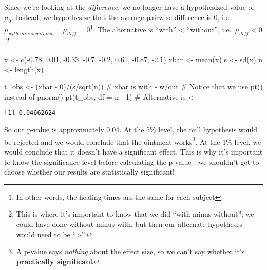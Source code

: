 \documentclass[
  letterpaper,
  DIV=11,
  numbers=noendperiod]{scrreprt}
\newenvironment{Shaded}{\begin{snugshade}}{\end{snugshade}}
\newcommand{\AttributeTok}[1]{\textcolor[rgb]{0.40,0.45,0.13}{#1}}
\newcommand{\CommentTok}[1]{\textcolor[rgb]{0.37,0.37,0.37}{#1}}
\newcommand{\DecValTok}[1]{\textcolor[rgb]{0.68,0.00,0.00}{#1}}
\newcommand{\FloatTok}[1]{\textcolor[rgb]{0.68,0.00,0.00}{#1}}
\newcommand{\FunctionTok}[1]{\textcolor[rgb]{0.28,0.35,0.67}{#1}}
\newcommand{\NormalTok}[1]{\textcolor[rgb]{0.00,0.23,0.31}{#1}}
\newcommand{\OtherTok}[1]{\textcolor[rgb]{0.00,0.23,0.31}{#1}}
\newcommand{\SpecialCharTok}[1]{\textcolor[rgb]{0.37,0.37,0.37}{#1}}
\begin{document}
Since we're looking at the \emph{difference}, we no longer have a
hypothesized value of \(\mu_0\). Instead, we hypothesize that the
average pairwise difference is 0,
i.e.~\(\mu_{with\; minus\; without} = \mu_{diff} = 0\)\footnote{In other
  words, the healing times are the same for each subject}. The
alternative is ``with'' \textless{} ``without'',
i.e.~\(\mu_{diff} < 0\).\footnote{This is where it's important to know
  that we did ``with minus without''; we could have done without minus
  with, but then our alternate hypotheses would need to be
  ``\textgreater{}''.}

\begin{Shaded}
\begin{Highlighting}[]
\NormalTok{x }\OtherTok{\textless{}{-}} \FunctionTok{c}\NormalTok{(}\SpecialCharTok{{-}}\FloatTok{0.78}\NormalTok{, }\FloatTok{0.01}\NormalTok{, }\SpecialCharTok{{-}}\FloatTok{0.33}\NormalTok{, }\SpecialCharTok{{-}}\FloatTok{0.7}\NormalTok{, }\SpecialCharTok{{-}}\FloatTok{0.2}\NormalTok{, }\FloatTok{0.61}\NormalTok{, }\SpecialCharTok{{-}}\FloatTok{0.87}\NormalTok{, }\SpecialCharTok{{-}}\FloatTok{2.1}\NormalTok{)}
\NormalTok{xbar }\OtherTok{\textless{}{-}} \FunctionTok{mean}\NormalTok{(x)}
\NormalTok{s }\OtherTok{\textless{}{-}} \FunctionTok{sd}\NormalTok{(x)}
\NormalTok{n }\OtherTok{\textless{}{-}} \FunctionTok{length}\NormalTok{(x)}

\NormalTok{t\_obs }\OtherTok{\textless{}{-}}\NormalTok{ (xbar }\SpecialCharTok{{-}} \DecValTok{0}\NormalTok{)}\SpecialCharTok{/}\NormalTok{(s}\SpecialCharTok{/}\FunctionTok{sqrt}\NormalTok{(n)) }\CommentTok{\# xbar is with {-} w/out}
\CommentTok{\# Notice that we use pt() instead of pnorm()}
\FunctionTok{pt}\NormalTok{(t\_obs, }\AttributeTok{df =}\NormalTok{ n }\SpecialCharTok{{-}} \DecValTok{1}\NormalTok{) }\CommentTok{\# Alternative is \textless{}}
\end{Highlighting}
\end{Shaded}

\begin{verbatim}
[1] 0.04662624
\end{verbatim}

So our p-value is approximately 0.04. At the 5\% level, the null
hypothesis would be rejected and we would conclude that the ointment
works\footnote{A p-value says \emph{nothing} about the effect size, so
  we can't say whether it's \textbf{practically significant}}. At the
1\% level, we would conclude that it doesn't have a significant effect.
This is why it's important to know the significance level before
calculating the p-value - we shouldn't get to choose whether our results
are statistically significant!
\end{document}
